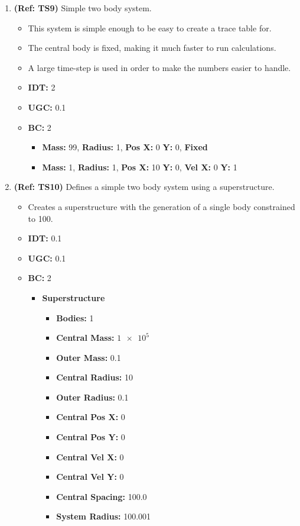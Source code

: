 \begin{enumerate}
\vspace{12pt}
\item \textbf{(Ref: TS9)} Simple two body system.
  \begin{itemize}
  \item This system is simple enough to be easy to create a trace table for.
  \item The central body is fixed, making it much faster to run calculations.
  \item A large time-step is used in order to make the numbers easier to handle.
  \item \textbf{IDT:} 2
  \item \textbf{UGC:} 0.1 
  \item \textbf{BC:} 2
    \begin{itemize}
    \item \textbf{Mass:} 99, \textbf{Radius:} 1, \textbf{Pos X:} 0 \textbf{Y:} 0, \textbf{Fixed}
    \item \textbf{Mass:} 1, \textbf{Radius:} 1, \textbf{Pos X:} 10 \textbf{Y:} 0, \textbf{Vel X:} 0 \textbf{Y:} 1
    \end{itemize}
  \end{itemize}  
  
\pagebreak  
\item \textbf{(Ref: TS10)} Defines a simple two body system using a superstructure.
  \begin{itemize}
  \item Creates a superstructure with the generation of a single body constrained to 100.
  \item \textbf{IDT:} 0.1
  \item \textbf{UGC:} 0.1
  \item \textbf{BC:} 2
    \begin{itemize}
    \item \textbf{Superstructure}
      \begin{itemize}
      \item \textbf{Bodies:} 1
      \item \textbf{Central Mass:} $\num{1e5}$
      \item \textbf{Outer Mass:} 0.1
      \item \textbf{Central Radius:} 10
      \item \textbf{Outer Radius:} 0.1
      \item \textbf{Central Pos X:} 0
      \item \textbf{Central Pos Y:} 0
      \item \textbf{Central Vel X:} 0
      \item \textbf{Central Vel Y:} 0
      \item \textbf{Central Spacing:} 100.0
      \item \textbf{System Radius:} 100.001
      \end{itemize}
    \end{itemize}
  \end{itemize}
  

\end{enumerate}
